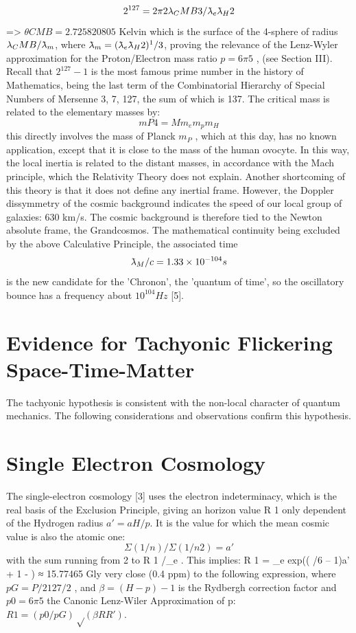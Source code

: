 $$2^{127} = 2\pi 2 \lambda_CMB 3 /\lambdabar_e \lambdabar_H 2$$
=> $θ CMB = 2.725820805$ Kelvin which is the surface of the 4-sphere of radius $\lambda_CMB / \lambdabar_m$, where $\lambdabar_m = (\lambdabar_e \lambdabar_H 2 )^1/3 $, proving the relevance of
the Lenz-Wyler approximation for the Proton/Electron mass ratio $p = 6\pi 5$ , (see Section III). Recall
that $2^127 - 1$ is the most famous prime number in the history of Mathematics, being the last term of
the Combinatorial Hierarchy of Special Numbers of Mersenne 3, 7, 127, the sum of which is 137.
The critical mass is related to the elementary masses by:
$$m P4 = M m_e m_p m_H$$
this directly involves the mass of Planck $m_P$ , which at this day, has no known application, except
that it is close to the mass of the human ovocyte. In this way, the local inertia is related to the distant
masses, in accordance with the Mach principle, which the Relativity Theory does not explain.
Another shortcoming of this theory is that it does not define any inertial frame. However, the
Doppler dissymmetry of the cosmic background indicates the speed of our local group of galaxies:
630 km/s. The cosmic background is therefore tied to the Newton absolute frame, the Grandcosmos.
The mathematical continuity being excluded by the above Calculative Principle, the associated
time $$\lambdabar_M /c = 1.33 \times 10^{-104} s$$ is the new candidate for the 'Chronon', the 'quantum of time', so the
oscillatory bounce has a frequency about $10^{104}Hz$ [5].

\section {Evidence for Tachyonic Flickering Space-Time-Matter}

The tachyonic hypothesis is consistent with the non-local character of quantum mechanics. The
following considerations and observations confirm this hypothesis.

\section {Single Electron Cosmology}

The single-electron cosmology [3] uses the electron indeterminacy, which is the real basis of the
Exclusion Principle, giving an horizon value R 1 only dependent of the Hydrogen radius $a' = aH/p$. It
is the value for which the mean cosmic value is also the atomic one:
$$Σ(1/n)/Σ(1/n 2 ) = a'$$
with the sum running from 2 to R 1 /\lambdabar_e . This implies:
R 1 = \lambdabar_e exp(( /6 – 1)a' + 1 - \gamma) ≈ 15.77465 Gly
very close (0.4 ppm) to the following expression, where $p G = P/2 127/2$ , and $β = (Η-p) -1$ is the
Rydbergh correction factor and $p 0 = 6\pi 5$ the Canonic Lenz-Wiler Approximation of p:
$R 1 = ( p 0 /p G ) √(βRR')$.

